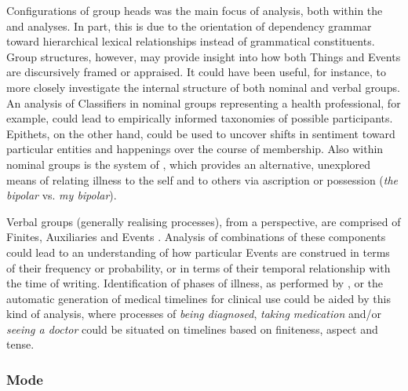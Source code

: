 Configurations of group heads was the main focus of analysis, both within the  and  analyses. In part, this is due to the orientation of dependency grammar toward hierarchical lexical relationships instead of grammatical constituents. Group structures, however, may provide insight into how both Things and Events are discursively framed or appraised. It could have been useful, for instance, to more closely investigate the internal structure of both nominal and verbal groups. An analysis of Classifiers in nominal groups representing a health professional, for example, could lead to empirically informed taxonomies of possible participants. Epithets, on the other hand, could be used to uncover shifts in sentiment toward particular entities and happenings over the course of membership. Also within nominal groups is the system of , which provides an alternative, unexplored means of relating illness to the self and to others via ascription or possession (\emph{the bipolar} vs. \emph{my bipolar}).

Verbal groups (generally realising processes), from a  perspective, are comprised of Finites, Auxiliaries and Events \cite{halliday_introduction_2004}. Analysis of combinations of these components could lead to an understanding of how particular Events are construed in terms of their frequency or probability, or in terms of their temporal relationship with the time of writing. Identification of phases of illness, as performed by \textcite{maclean_forum77:_2015}, or the automatic generation of medical timelines for clinical use \cite{raghavan_medical_2014} could be aided by this kind of analysis, where processes of \emph{being diagnosed}, \emph{taking medication} and\slash or \emph{seeing a doctor} could be situated on timelines based on finiteness, aspect and tense.

\subsubsection*{Mode} \label{sect:limitation-mode}

